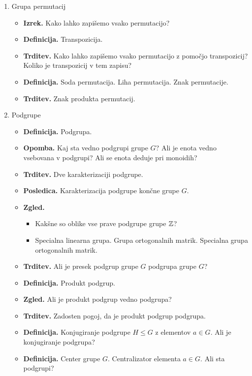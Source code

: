 \begin{enumerate}
    \item Grupa permutacij
    \begin{itemize}
        \item \textbf{Izrek.} Kako lahko zapišemo vsako permutacijo?
        \item \textbf{Definicija.} Transpozicija.
        \item \textbf{Trditev.} Kako lahko zapišemo vsako permutacijo z pomočjo transpozicij? Koliko je transpozicij v tem zapisu?
        \item \textbf{Definicija.} Soda permutacija. Liha permutacija. Znak permutacije.
        \item \textbf{Trditev.} Znak produkta permutacij.
    \end{itemize}

    \item Podgrupe
    \begin{itemize}
        \item \textbf{Definicija.} Podgrupa.
        \item \textbf{Opomba.} Kaj sta vedno podgrupi grupe \(G\)? Ali je enota vedno vsebovana v podgrupi? Ali se enota deduje pri monoidih?
        \item \textbf{Trditev.} Dve karakterizaciji podgrupe.
        \item \textbf{Posledica.} Karakterizacija podgrupe končne grupe \(G\).
        \item \textbf{Zgled.} \ 
        \begin{itemize}
            \item Kakšne so oblike vse prave podgrupe grupe \(\mathbb{Z}\)?
            \item Specialna linearna grupa. Grupa ortogonalnih matrik. Specialna grupa ortogonalnih matrik.
        \end{itemize}
        \item \textbf{Trditev.} Ali je presek podgrup grupe \(G\) podgrupa grupe \(G\)?
        \item \textbf{Definicija.} Produkt podgrup.
        \item \textbf{Zgled.} Ali je produkt podgrup vedno podgrupa?
        \item \textbf{Trditev.} Zadosten pogoj, da je produkt podgrup podgrupa.
        \item \textbf{Definicija.} Konjugiranje podgrupe \(H \leq G\) z elementov \(a \in G\). Ali je konjugiranje podgrupa?
        \item \textbf{Definicija.} Center grupe \(G\). Centralizator elementa \(a \in G\). Ali sta podgrupi?
    \end{itemize}


\end{enumerate}
